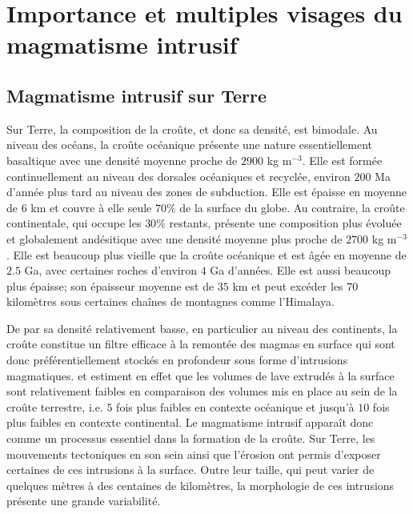 \section{Importance et multiples visages du magmatisme intrusif}
\label{C1-sec:zool-des-intr}

\subsection{Magmatisme intrusif sur Terre}
\label{C1-sec:definition}

Sur  Terre, la  composition  de la  croûte, et  donc  sa densité,  est
bimodale.  Au niveau  des  océans, la  croûte  océanique présente  une
nature essentiellement  basaltique avec une densité  moyenne proche de
$2900$  kg m$^{-3}$.  Elle est  formée continuellement  au niveau  des
dorsales océaniques et recyclée, environ $200$ Ma d'année plus tard au
niveau des zones de subduction. Elle  est épaisse en moyenne de $6$ km
et couvre à elle seule $70\%$ de la surface du globe. Au contraire, la
croûte  continentale, qui  occupe  les $30\%$  restants, présente  une
composition plus  évoluée et globalement andésitique  avec une densité
moyenne  plus proche  de $2700$  kg m$^{-3}$.  Elle est  beaucoup plus
vieille que  la croûte océanique et  est âgée en moyenne  de $2.5$ Ga,
avec  certaines  roches d'environ  $4$  Ga  d'années. Elle  est  aussi
beaucoup plus  épaisse; son épaisseur moyenne  est de $35$ km  et peut
excéder les $70$ kilomètres sous  certaines chaînes de montagnes comme
l'Himalaya.

De par sa densité relativement basse, en particulier au niveau des
continents, la croûte constitue un filtre efficace à la remontée des
magmas en surface qui sont donc préférentiellement stockés en
profondeur sous forme d'intrusions magmatiques. \citet{Crisp:1984dm}
et \citet{White:2006gr} estiment en effet que les volumes de lave
extrudés à la surface sont relativement faibles en comparaison des
volumes mis en place au sein de la croûte terrestre, i.e. $5$ fois
plus faibles en contexte océanique et jusqu'à $10$ fois plus faibles
en contexte continental. Le magmatisme intrusif apparaît donc comme
un processus essentiel dans la formation de la croûte. Sur Terre, les
mouvements tectoniques en son sein ainsi que l'érosion ont permis
d'exposer certaines de ces intrusions à la surface. Outre leur
taille, qui peut varier de quelques mètres à des centaines de
kilomètres, la morphologie de ces intrusions présente une grande
variabilité.


